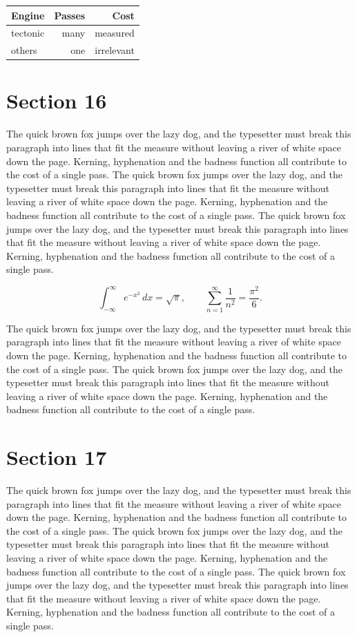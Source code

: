\documentclass{article}
\begin{document}
\begin{center}
\begin{tabular}{lrr}
\toprule
Engine & Passes & Cost \\
\midrule
tectonic & many & measured \\
others & one & irrelevant \\
\bottomrule
\end{tabular}
\end{center}

\section{Section 16}
The quick brown fox jumps over the lazy dog, and the typesetter must break this paragraph into lines that fit the measure without leaving a river of white space down the page. Kerning, hyphenation and the badness function all contribute to the cost of a single pass. The quick brown fox jumps over the lazy dog, and the typesetter must break this paragraph into lines that fit the measure without leaving a river of white space down the page. Kerning, hyphenation and the badness function all contribute to the cost of a single pass. The quick brown fox jumps over the lazy dog, and the typesetter must break this paragraph into lines that fit the measure without leaving a river of white space down the page. Kerning, hyphenation and the badness function all contribute to the cost of a single pass. 

\begin{equation}
\int_{-\infty}^{\infty} e^{-x^{2}}\,dx = \sqrt{\pi}, \qquad
\sum_{n=1}^{\infty} \frac{1}{n^{2}} = \frac{\pi^{2}}{6}.
\end{equation}

The quick brown fox jumps over the lazy dog, and the typesetter must break this paragraph into lines that fit the measure without leaving a river of white space down the page. Kerning, hyphenation and the badness function all contribute to the cost of a single pass. The quick brown fox jumps over the lazy dog, and the typesetter must break this paragraph into lines that fit the measure without leaving a river of white space down the page. Kerning, hyphenation and the badness function all contribute to the cost of a single pass. 
\section{Section 17}
The quick brown fox jumps over the lazy dog, and the typesetter must break this paragraph into lines that fit the measure without leaving a river of white space down the page. Kerning, hyphenation and the badness function all contribute to the cost of a single pass. The quick brown fox jumps over the lazy dog, and the typesetter must break this paragraph into lines that fit the measure without leaving a river of white space down the page. Kerning, hyphenation and the badness function all contribute to the cost of a single pass. The quick brown fox jumps over the lazy dog, and the typesetter must break this paragraph into lines that fit the measure without leaving a river of white space down the page. Kerning, hyphenation and the badness function all contribute to the cost of a single pass. 
\end{document}
